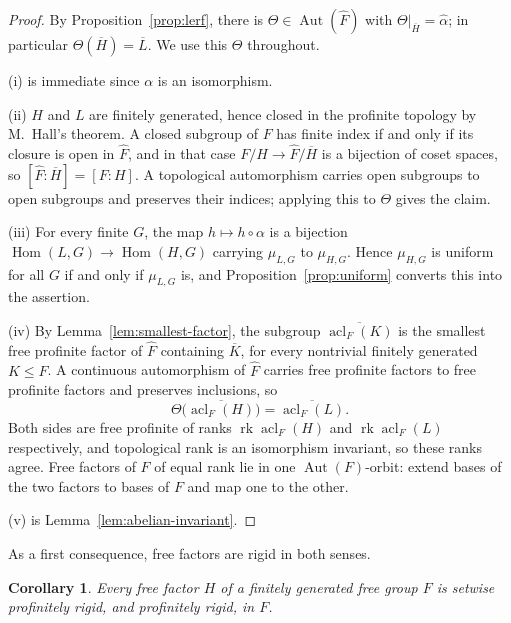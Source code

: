 \documentclass[11pt]{amsart}
\theoremstyle{plain}
\newtheorem{corollary}[theorem]{Corollary}
\theoremstyle{definition}
\newcommand{\acl}{\operatorname{acl}}
\newcommand{\rk}{\operatorname{rk}}
\newcommand{\Hom}{\operatorname{Hom}}
\newcommand{\Aut}{\operatorname{Aut}}
\newcommand{\Fhat}{\widehat{F}}
\begin{document}
\begin{proof}
By Proposition~\ref{prop:lerf}, there is $\Theta\in\Aut(\Fhat)$ with
$\Theta|_{\overline H}=\widehat\alpha$; in particular
$\Theta(\overline H)=\overline L$.  We use this $\Theta$ throughout.

(i) is immediate since $\alpha$ is an isomorphism.

(ii)  $H$ and $L$ are finitely generated, hence closed in the profinite topology
by M.~Hall's theorem.  A closed subgroup of $F$ has finite index if and only if
its closure is open in $\Fhat$, and in that case $F/H\to\Fhat/\overline H$ is a
bijection of coset spaces, so $[\Fhat:\overline H]=[F:H]$.  A topological
automorphism carries open subgroups to open subgroups and preserves their
indices; applying this to $\Theta$ gives the claim.

(iii)  For every finite $G$, the map $h\mapsto h\circ\alpha$ is a bijection
$\Hom(L,G)\to\Hom(H,G)$ carrying $\mu_{L,G}$ to $\mu_{H,G}$.  Hence $\mu_{H,G}$
is uniform for all $G$ if and only if $\mu_{L,G}$ is, and
Proposition~\ref{prop:uniform} converts this into the assertion.

(iv)  By Lemma~\ref{lem:smallest-factor}, the subgroup $\overline{\acl_F(K)}$ is
the smallest free profinite factor of $\Fhat$ containing $\overline K$, for every
nontrivial finitely generated $K\le F$.  A continuous automorphism of $\Fhat$
carries free profinite factors to free profinite factors and preserves
inclusions, so
\[
  \Theta\bigl(\overline{\acl_F(H)}\bigr)=\overline{\acl_F(L)} .
\]
Both sides are free profinite of ranks $\rk\acl_F(H)$ and $\rk\acl_F(L)$
respectively, and topological rank is an isomorphism invariant, so these ranks
agree.  Free factors of $F$ of equal rank lie in one $\Aut(F)$-orbit: extend
bases of the two factors to bases of $F$ and map one to the other.

(v) is Lemma~\ref{lem:abelian-invariant}.
\end{proof}
As a first consequence, free factors are rigid in both senses.

\begin{corollary}
Every free factor $H$ of a finitely generated free group $F$ is
setwise profinitely rigid, and profinitely rigid, in $F$.
\end{corollary}
\end{document}

